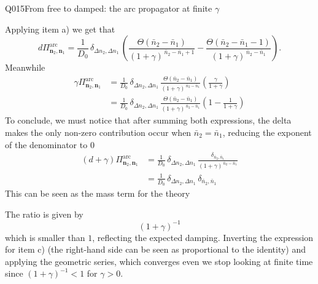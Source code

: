 \begin{entry}{Q015}{From free to damped: the arc propagator at finite $\gamma$}
\begin{solution}[c]
Applying item a) we get that 
\begin{equation}
  d \Pi^{\mathrm{arc}}_{\mathbf n_2,\mathbf n_1}
          =\frac{1}{D_0}\,\delta_{\Delta n_2,\Delta n_1}\,
            \left(\frac{\Theta(\bar n_2-\bar n_1)}{(1+\gamma)^{\,\bar n_2-\bar n_1+1}}-\frac{\Theta(\bar n_2-\bar n_1-1)}{(1+\gamma)^{\,\bar n_2-\bar n_1}} \right) .
\end{equation}
Meanwhile 
\begin{equation}
\begin{split}
    \gamma \Pi^{\mathrm{arc}}_{\mathbf n_2,\mathbf n_1}
          &=\frac{1}{D_0}\,\delta_{\Delta n_2,\Delta n_1}\,
            \frac{\Theta(\bar n_2-\bar n_1)}{(1+\gamma)^{\,\bar n_2-\bar n_1}}\left(\frac{\gamma}{1+\gamma} \right) \\
         &=\frac{1}{D_0}\,\delta_{\Delta n_2,\Delta n_1}\,
            \frac{\Theta(\bar n_2-\bar n_1)}{(1+\gamma)^{\,\bar n_2-\bar n_1}}\left(1-\frac{1}{1+\gamma} \right)  
\end{split}
\end{equation}
 To conclude, we must notice that after summing both expressions, the delta makes the only non-zero contribution occur when $\bar n_2 = \bar n_1$, reducing the exponent of the denominator to 0
 \begin{equation}
 \begin{split}
      (d+\gamma) \Pi^{\mathrm{arc}}_{\mathbf n_2,\mathbf n_1}
          &=\frac{1}{D_0}\,\delta_{\Delta n_2,\Delta n_1}\,
            \frac{\delta_{\bar n_2,\bar n_1}}{(1+\gamma)^{\,\bar n_2-\bar n_1}} \\
            &= \frac{1}{D_0}\,\delta_{\Delta n_2,\Delta n_1}\,
            \delta_{\bar n_2,\bar n_1} 
 \end{split}
 \end{equation}
This can be seen as the mass term for the theory
\end{solution}

\begin{solution}[d]
The ratio is given by 
\begin{equation*}
        (1+\gamma)^{-1}
\end{equation*}
which is smaller than $1$, reflecting the expected damping.
Inverting the expression for item c) (the right-hand side can be seen as proportional to the identity) and applying the geometric series, which converges even we stop looking at finite time since $(1+\gamma)^{-1} <1$ for $\gamma>0$. 


\end{solution}
\end{entry}
